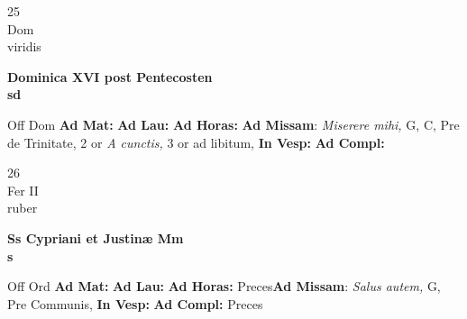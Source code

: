 \documentclass[10pt, openany]{book}
\begin{document}
        \begin{center}
            \begin{minipage}{3.5in}
                \vspace{2em}
                \begin{minipage}{0.5in}
                    {\Huge 25} \\
                    {\normalsize Dom} \\
                    {\normalsize viridis}
                \end{minipage}
                \begin{minipage}{3.0in}
                    \textbf{ \large Dominica XVI post Pentecosten \\
                    \textnormal{\normalsize sd}} \\ 
                \end{minipage}
                \begin{justify}Off Dom
                    \textbf{Ad Mat: }
                    \textbf{Ad Lau: }
                    \textbf{Ad Horas: }\textbf{Ad Missam}: \textit{Miserere mihi,} G, C, Pre de Trinitate, 2 or \textit{A cunctis,} 3 or ad libitum,  
                    \textbf{In Vesp: }
                    \textbf{Ad Compl: }
                \end{justify}
            \end{minipage}
        \end{center}
    
        \begin{center}
            \begin{minipage}{3.5in}
                \vspace{2em}
                \begin{minipage}{0.5in}
                    {\Huge 26} \\
                    {\normalsize Fer II} \\
                    {\normalsize ruber}
                \end{minipage}
                \begin{minipage}{3.0in}
                    \textbf{ \large Ss Cypriani et Justinæ Mm \\
                    \textnormal{\normalsize s}} \\ 
                \end{minipage}
                \begin{justify}Off Ord
                    \textbf{Ad Mat: }
                    \textbf{Ad Lau: }
                    \textbf{Ad Horas: }Preces\textbf{Ad Missam}: \textit{Salus autem,} G, Pre Communis,  
                    \textbf{In Vesp: }
                    \textbf{Ad Compl: }Preces
                \end{justify}
            \end{minipage}
        \end{center}
    
\end{document}
